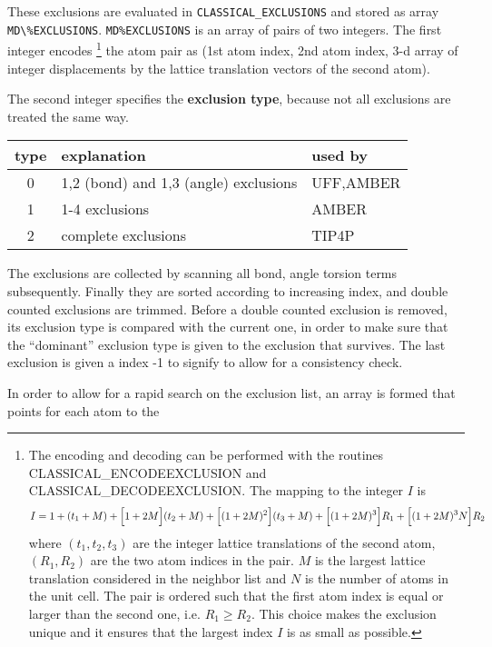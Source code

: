 \documentclass[11pt,a4paper]{report}
\begin{document}
These exclusions are evaluated in \verb|CLASSICAL_EXCLUSIONS| and
stored as array \verb|MD\%EXCLUSIONS|. \verb|MD%EXCLUSIONS| is an
array of pairs of two integers. The first integer encodes
\footnote{The encoding and decoding can be performed with the routines
  CLASSICAL\_ENCODEEXCLUSION and CLASSICAL\_DECODEEXCLUSION. The mapping to the integer $I$ is
\begin{eqnarray}
I=1+(t_1+M)
+\Bigl[1+2M\Bigr](t_2+M)
+\Bigl[(1+2M)^2\Bigr](t_3+M)
+\Bigl[(1+2M)^3\Bigr]R_1
+\Bigl[(1+2M)^3N\Bigr] R_2
\end{eqnarray}
where $(t_1,t_2,t_3)$ are the integer lattice translations of the
second atom, $(R_1,R_2)$ are the two atom indices in the pair. $M$ is
the largest lattice translation considered in the neighbor list and
$N$ is the number of atoms in the unit cell.  The pair is ordered such
that the first atom index is equal or larger than the second one,
i.e. $R_1\ge R_2$. This choice makes the exclusion unique and it
ensures that the largest index $I$ is as small as possible.
} 
the atom pair as (1st
atom index, 2nd atom index, 3-d array of integer displacements by the
lattice translation vectors of the second atom).

The second integer specifies the \textbf{exclusion
  type}, because not all exclusions are treated
the same way.
\begin{center}
\begin{tabular}{|c|l|l|}
\hline
type & explanation & used by \\
\hline
0 & 1,2 (bond) and 1,3 (angle) exclusions & UFF,AMBER\\
1 & 1-4 exclusions                        & AMBER \\
2 & complete exclusions                   & TIP4P \\
\hline
\end{tabular}
\end{center}

The exclusions are collected by scanning all bond, angle torsion terms
subsequently. Finally they are sorted according to increasing index,
and double counted exclusions are trimmed. Before a double counted
exclusion is removed, its exclusion type is compared with the current
one, in order to make sure that the ``dominant'' exclusion type is
given to the exclusion that survives. The last exclusion is given a
index -1 to signify to allow for a consistency check.

In order to allow for a rapid search on the exclusion list, an array
is formed that points for each atom to the 
\end{document}
